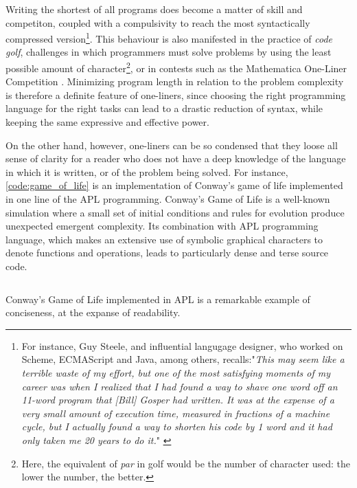 Writing the shortest of all programs does become a matter of skill and competiton, coupled with a compulsivity to reach the most syntactically compressed version\footnote{For instance, Guy Steele, and influential langugage designer, who worked on Scheme, ECMAScript and Java, among others, recalls:"\emph{This may seem like a terrible waste of my effort, but one of the most satisfying moments of my career was when I realized that I had found a way to shave one word off an 11-word program that [Bill] Gosper had written. It was at the expense of a very small amount of execution time, measured in fractions of a machine cycle, but I actually found a way to shorten his code by 1 word and it had only taken me 20 years to do it.}" \citep{seibel_coders_2009}}.
This behaviour is also manifested in the practice of \emph{code golf}, challenges in which programmers must solve problems by using the least possible amount of character\footnote{Here, the equivalent of \emph{par} in golf would be the number of character used: the lower the number, the better.}, or in contests such as the Mathematica One-Liner Competition \citep{carlson_mathematica_2010}. Minimizing program length in relation to the problem complexity is therefore a definite feature of one-liners, since choosing the right programming language for the right tasks can lead to a drastic reduction of syntax, while keeping the same expressive and effective power.

On the other hand, however, one-liners can be so condensed that they loose all sense of clarity for a reader who does not have a deep knowledge of the language in which it is written, or of the problem being solved. For instance, \autoref{code:game_of_life} is an implementation of Conway's game of life implemented in one line of the APL programming. Conway's Game of Life is a well-known simulation where a small set of initial conditions and rules for evolution produce unexpected emergent complexity. Its combination with APL programming language, which makes an extensive use of symbolic graphical characters to denote functions and operations, leads to particularly dense and terse source code.

\begin{listing}
  \inputminted{text}{./corpus/game_of_life.apl}
  \caption{Conway's Game of Life implemented in APL is a remarkable example of conciseness, at the expanse of readability.}
  \label{code:game_of_life}
\end{listing}

